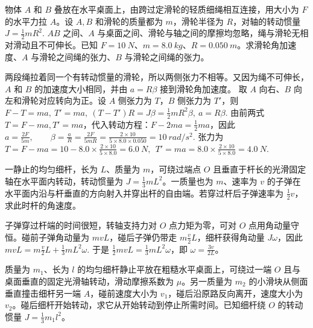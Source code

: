 \documentclass[lang=cn,11pt]{elegantbook}
\begin{document}
\begin{exercise}
物体 \(A\) 和 \(B\) 叠放在水平桌面上，由跨过定滑轮的轻质细绳相互连接，用大小为 \(F\) 的水平力拉 \(A\)。设 \(A,B\) 和滑轮的质量都为 \(m\)，滑轮半径为 \(R\)，对轴的转动惯量
 \(J=\frac12mR^2.\) 
\(AB\) 之间、\(A\) 与桌面之间、滑轮与轴之间的摩擦均忽略，绳与滑轮无相对滑动且不可伸长。已知 \(F=\SI{10}{N}\)、\(m=\SI{8.0}{kg}\)、\(R=\SI{0.050}{m}\)。求滑轮角加速度、\(A\) 与滑轮之间绳的张力、\(B\) 与滑轮之间绳的张力。
\end{exercise}
\begin{solution}
两段绳拉着同一个有转动惯量的滑轮，所以两侧张力不相等。又因为绳不可伸长，\(A\) 和 \(B\) 的加速度大小相同，并由 \(a=R\beta\) 接到滑轮角加速度。
 取 \(A\) 向右、\(B\) 向左和滑轮对应转向为正。设 \(A\) 侧张力为 \(T\)，\(B\) 侧张力为 \(T'\)，则
 \(F-T=ma,~ T'=ma,~ (T-T')R=J\beta=\frac12mR^2\beta,~ a=R\beta.\) 
由前两式$T=F-ma, T'=ma$，代入转动方程：$F-2ma=\frac12m a$，因此
 \(a=\frac{2F}{5m},\qquad \beta=\frac{a}{R}=\frac{2F}{5mR}=\frac{2\times10}{5\times8.0\times0.050} =\SI{10}{rad/s^2}.\) 
张力为
 \(T=F-ma=10-8.0\times\frac{2\times10}{5\times8.0} =\SI{6.0}{N},~~ T'=ma=8.0\times\frac{2\times10}{5\times8.0} =\SI{4.0}{N}.\) 
\end{solution}


\begin{exercise}
一静止的均匀细杆，长为 \(L\)、质量为 \(m\)，可绕过端点 \(O\) 且垂直于杆长的光滑固定轴在水平面内转动，转动惯量为 \(J=\frac13mL^2\)。一质量也为 \(m\)、速率为 \(v\) 的子弹在水平面内沿与杆垂直的方向射入并穿出杆的自由端。若穿过杆后子弹速率为 \(\frac12v\)，求此时杆的角速度。
\end{exercise}

\begin{solution}
子弹穿过杆端的时间很短，转轴支持力对 \(O\) 点力矩为零，可对 \(O\) 点用角动量守恒。碰前子弹角动量为 \(mvL\)，碰后子弹仍带走 \(m\frac{v}{2}L\)，细杆获得角动量 \(J\omega\)，因此
 \(mvL=m\frac{v}{2}L+\frac13mL^2\omega.\) 
于是 \(\frac12mvL=\frac13mL^2\omega\)，即 \(\omega=\frac{3v}{2L}\)。
\end{solution}

\begin{exercise}
质量为 \(m_1\)、长为 \(l\) 的均匀细杆静止平放在粗糙水平桌面上，可绕过一端 \(O\) 且与桌面垂直的固定光滑轴转动，滑动摩擦系数为 \(\mu\)。另一质量为 \(m_2\) 的小滑块从侧面垂直撞击细杆另一端 \(A\)，碰前速度大小为 \(v_1\)，碰后沿原路反向离开，速度大小为 \(v_2\)。碰后细杆开始转动，求它从开始转动到停止所需时间。已知细杆绕 \(O\) 的转动惯量 \(J=\frac13m_1l^2\)。
\end{exercise}
\end{document}

